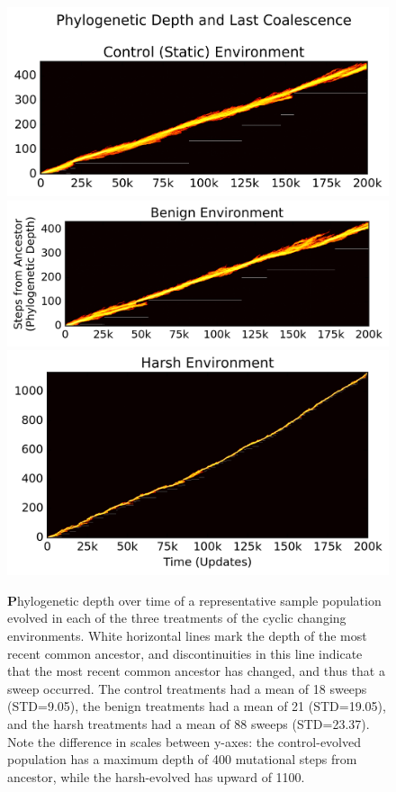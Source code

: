 \documentclass[PhD]{msu-thesis}
\begin{document}
\begin{figure}[!h]
\includegraphics[trim={-0.88cm 0 0.25cm 0},clip,width=0.75\columnwidth]{figures/CE/control__phylodepth_with_coalescense.png}
\includegraphics[trim={0.2cm 0 0.25cm 0},clip,width=0.75\columnwidth]{figures/CE/benign__phylodepth_with_coalescense.png}
\includegraphics[trim={-0.63cm 0 0.25cm 0},clip,width=0.75\columnwidth]{figures/CE/harsh__phylodepth_with_coalescense.png}
\caption{{\textbf Phylogenetic depth over time of a representative sample population} evolved in each of the three treatments of the cyclic changing environments. White horizontal lines mark the depth of the most recent common ancestor, and discontinuities in this line indicate that the most recent common ancestor has changed, and thus that a sweep occurred. The control treatments had a mean of 18 sweeps (STD=9.05), the benign treatments had a mean of 21 (STD=19.05), and the harsh treatments had a mean of 88 sweeps (STD=23.37). Note the difference in scales between y-axes: the control-evolved population has a maximum depth of 400 mutational steps from ancestor, while the harsh-evolved has upward of 1100. %
}\label{fig:flamegraph}
\end{figure}
\end{document}
